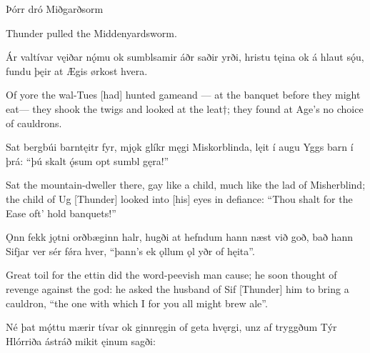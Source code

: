 Þórr dró Miðgarðsorm

Thunder pulled the Middenyardsworm.

Ár valtívar \hld vęiðar nǫ́mu
ok sumblsamir \hld áðr saðir yrði,
hristu tęina \hld ok á hlaut sǫ́u,
fundu þęir at Ægis \hld ørkost hvera.

Of yore the wal-Tues [had] hunted game\footnotemark[1] and — at the banquet before they might eat\footnotemark[1] — they shook the twigs and looked at the leat†; they found at Age’s no choice of cauldrons.

Sat bergbúi \hld barntęitr fyr,
mjǫk glíkr męgi \hld Miskorblinda,
lęit í augu \hld Yggs barn í þrá:
“þú skalt ǫ́sum \hld opt sumbl gęra!”

Sat the mountain-dweller there, gay like a child, much like the lad of Misherblind; the child of Ug [Thunder] looked into [his] eyes in defiance: “Thou shalt for the Ease oft’ hold banquets!”

Ǫnn fekk jǫtni \hld orðbæginn halr,
hugði at hefndum \hld hann næst við goð,
bað hann Sifjar ver \hld sér fǿra hver,
“þann’s ek ǫllum ǫl \hld yðr of hęita”.

Great toil for the ettin did the word-peevish man cause; he soon thought of revenge against the god: he asked the husband of Sif [Thunder] him to bring a cauldron, “the one with which I for you all might brew ale”.

Né þat mǫ́ttu \hld mærir tívar
ok ginnręgin \hld of geta hvęrgi,
unz af tryggðum \hld Týr Hlórriða
ástráð mikit \hld ęinum sagði: 

